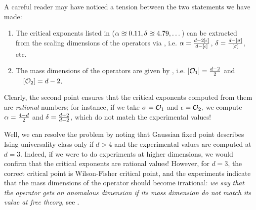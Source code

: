 A careful reader may have noticed a tension between the two statements we have made:
\begin{enumerate}
	\item The critical exponents listed in  ($\alpha\approxeq0.11,\delta\approxeq4.79,\dots$) can be extracted from the scaling dimensions of the operators via , i.e. $	\alpha=\frac{d-2[\epsilon]}{d-[\epsilon]}$, $\delta=\frac{d-[\sigma]}{[\sigma]}$, etc.
	\item The mass dimensions of the operators are given by , i.e. $[\mathcal{O}_1]=\frac{d-2}{2}$ and \mbox{$\quad [\mathcal{O}_2]=d-2$}.
\end{enumerate}
Clearly, the second point ensures that the critical exponents computed from them are \emph{rational} numbers; for instance, if we take $\sigma=\mathcal{O}_1$ and $\epsilon=\mathcal{O}_2$, we compute $\alpha=\frac{4-d}{2}$ and $\delta=\frac{d+2}{d-2}$, which do not match the experimental values!

Well, we can resolve the problem by noting that Gaussian fixed point describes Ising universality class only if $d>4$ and the experimental values are computed at $d=3$. Indeed, if we were to do experiments at higher dimensions, we would confirm that the critical exponents are rational values! However, for $d=3$, the correct critical point is Wilson-Fisher critical point, and the experiments indicate that the mass dimensions of the operator should become irrational: \emph{we say that the operator gets an anomalous dimension if its mass dimension do not match its value at free theory}, see \tabref{\ref{table: ising universality class as dimension changes}}.

